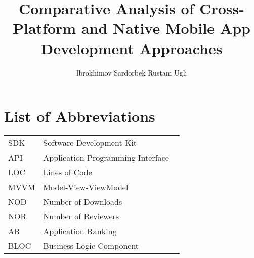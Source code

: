\documentclass[11pt,jaso]{pnumasterh}
\title{Comparative Analysis of Cross-Platform and Native Mobile App Development Approaches}
\author{Ibrokhimov Sardorbek Rustam Ugli}
\begin{document}
\maketitle 
\pagestyle{empty}

\newpage
\pagestyle{plain} 

\setlength\cftsecnumwidth{2.3em}

\tableofcontents
\newpage
\listoffigures 
\newpage
\listoftables 
\newpage
\section*{ \Huge List of Abbreviations}
\vskip 1.5cm


\begin{tabular}{@{}p{0.2\linewidth} p{0.8\linewidth}}
    SDK & Software Development Kit \\
    API & Application Programming Interface \\
    LOC & Lines of Code \\
    MVVM & Model-View-ViewModel  \\
    NOD & Number of Downloads \\
    NOR & Number of Reviewers \\
    AR & Application Ranking \\
    BLOC & Business Logic Component
\end{tabular}
\end{document}

